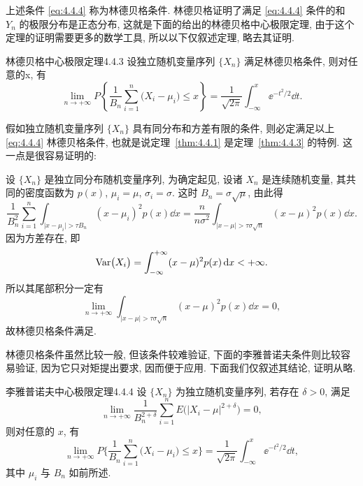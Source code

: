 上述条件 \eqref{eq:4.4.4} 称为{\heiti 林德贝格条件}.
林德贝格证明了满足 \eqref{eq:4.4.4} 条件的和 $ Y_n $ 的极限分布是正态分布, 这就是下面的给出的{\heiti 林德贝格中心极限定理}, 由于这个定理的证明需要更多的数学工具, 所以以下仅叙述定理, 略去其证明.

\begin{theorem}{林德贝格中心极限定理}{4.4.3}
    设独立随机变量序列 $ \{ X_n \} $ 满足林德贝格条件, 则对任意的x, 有
    \begin{equation*}
        \lim_{n \to +\infty} P \left\{ \frac{1}{B_n} \sum_{i=1}^n \bigl( X_i - \mu_i \bigr) \leq x \right\} = \frac{1}{\sqrt{2\pi}} \int_{-\infty}^x \ee^{-t^2 /2 } \dd t.
    \end{equation*}
\end{theorem}

假如独立随机变量序列 $ \{ X_n \} $ 具有同分布和方差有限的条件, 则必定满足以上 \eqref{eq:4.4.4} 林德贝格条件, 也就是说定理~\ref{thm:4.4.1} 是定理~\ref{thm:4.4.3} 的特例.
这一点是很容易证明的:

设 $ \{ X_n \} $ 是独立同分布随机变量序列, 为确定起见, 设诸 $ X_n $ 是连续随机变量, 其共同的密度函数为 $ p (x) $, $ \mu_i = \mu $, $ \sigma_i = \sigma $.
这时 $ B_n = \sigma \sqrt{\mu} $, 由此得
\begin{equation*}
    \frac{1}{B_n^2} \sum_{i=1}^n \int_{\lvert x - \mu_i \rvert > \tau B_n} ( x - \mu_i )^2 p (x) \dd x = \frac{n}{n \sigma^2} \int_{\lvert x - \mu \rvert > \tau \sigma \sqrt{n}} ( x - \mu )^2 p (x) \dd x.
\end{equation*}
因为方差存在, 即
\begin{equation*}
   \operatorname{Var}  \bigl( X_i \bigr) = \int_{-\infty}^{+\infty} ( x - \mu )^2 p (x) \mathop{}\!\mathrm d x < + \infty.
\end{equation*}
所以其尾部积分一定有
\begin{equation*}
    \lim_{n \to +\infty} \int_{\lvert x - \mu \rvert > \tau \sigma \sqrt{n}} ( x - \mu )^2 p (x) \dd x = 0,
\end{equation*}
故林德贝格条件满足.

林德贝格条件虽然比较一般, 但该条件较难验证, 下面的李雅普诺夫条件则比较容易验证, 因为它只对矩提出要求, 因而便于应用.
下面我们仅叙述其结论, 证明从略.

\begin{theorem}{李雅普诺夫中心极限定理}{4.4.4}
    设 $ \{ X_n \} $ 为独立随机变量序列, 若存在 $ \delta > 0 $, 满足
    \begin{equation}\label{eq:4.4.5}
        \lim_{n \to +\infty} \frac{1}{B_n^{2 + \delta}} \sum_{i=1}^n E \bigl( \bigl\lvert X_i - \mu \bigr\rvert^{2+\delta} \bigr) = 0,
    \end{equation}
    则对任意的 $ x $, 有
    \begin{equation*}
        \lim_{n \to +\infty} P \biggl\{ \frac{1}{B_n} \sum_{i=1}^n \bigl( X_i - \mu_i \bigr) \leq x \biggr\} = \frac{1}{\sqrt{2\pi}} \int_{-\infty}^x \ee^{-t^2/2} \dd t,
    \end{equation*}
    其中 $ \mu_i $ 与 $ B_n $ 如前所述.
\end{theorem}

